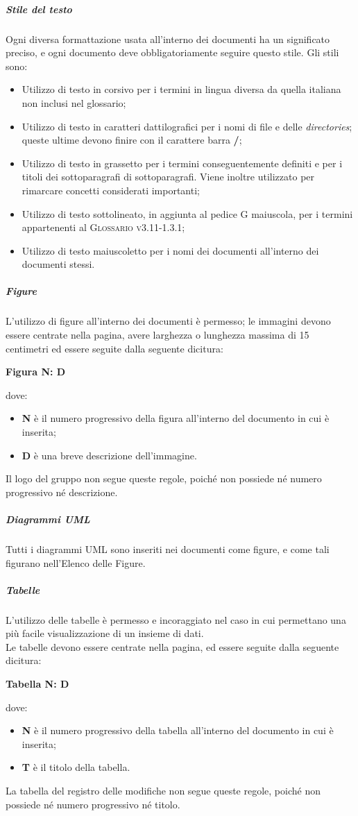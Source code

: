 \documentclass[../norme-di-progetto.tex]{subfiles}
\begin{document}
\subparagraph*{Stile del testo}
Ogni diversa formattazione usata all'interno dei documenti ha un significato preciso, e ogni documento deve obbligatoriamente seguire questo stile. Gli stili sono:
\begin{itemize}
  \item Utilizzo di testo in corsivo per i termini in lingua diversa da quella italiana non inclusi nel glossario;
  \item Utilizzo di testo in caratteri dattilografici per i nomi di file e delle \textit{directories}; queste ultime devono finire con il carattere barra \textbf{/};
  \item Utilizzo di testo in grassetto per i termini conseguentemente definiti e per i titoli dei sottoparagrafi di sottoparagrafi. Viene inoltre utilizzato per rimarcare concetti considerati importanti;
  \item Utilizzo di testo sottolineato, in aggiunta al pedice G maiuscola, per i termini appartenenti al \textsc{Glossario v3.11-1.3.1};
  \item Utilizzo di testo maiuscoletto per i nomi dei documenti all'interno dei documenti stessi.
\end{itemize}

\subparagraph*{Figure}
L'utilizzo di figure all'interno dei documenti è permesso; le immagini devono essere centrate nella pagina, avere larghezza o lunghezza massima di 15 centimetri ed essere seguite dalla seguente dicitura: \\ \begin{center}
  \centering
  \textbf{Figura N: D}
\end{center} dove:
\begin{itemize}
  \item \textbf{N} è il numero progressivo della figura all'interno del documento in cui è inserita;
  \item \textbf{D} è una breve descrizione dell'immagine.
\end{itemize}
Il logo del gruppo non segue queste regole, poiché non possiede né numero progressivo né descrizione.

\subparagraph*{Diagrammi UML}
Tutti i diagrammi UML sono inseriti nei documenti come figure, e come tali figurano nell'Elenco delle Figure.

\subparagraph*{Tabelle}
L'utilizzo delle tabelle è permesso e incoraggiato nel caso in cui permettano una più facile visualizzazione di un insieme di dati. \\
Le tabelle devono essere centrate nella pagina, ed essere seguite dalla seguente dicitura: \\ \begin{center}
  \centering
  \textbf{Tabella N: D}
\end{center} dove:
\begin{itemize}
  \item \textbf{N} è il numero progressivo della tabella all'interno del documento in cui è inserita;
  \item \textbf{T} è il titolo della tabella.
\end{itemize}
La tabella del registro delle modifiche non segue queste regole, poiché non possiede né numero progressivo né titolo.
\end{document}
